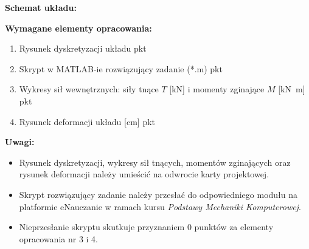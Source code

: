 \documentclass[a4paper,10pt]{article}
\begin{document}
    \vspace{5mm}

    \noindent\textbf{Schemat układu:}

    \vspace{5mm}

    \noindent\textbf{Wymagane elementy opracowania:}

    \begin{enumerate}
    \item Rysunek dyskretyzacji układu  pkt
    \item Skrypt w MATLAB-ie rozwiązujący zadanie (*.m)  pkt
    \item Wykresy sił wewnętrznych: siły tnące \(T\) [\si{\kilo\newton}] i momenty zginające \(M\) [\si{\kilo\newton m}]  pkt
    \item Rysunek deformacji układu [\si{\centi\meter}]  pkt
    \end{enumerate}

    \vspace{5mm}

    \noindent\textbf{Uwagi:}
    \begin{itemize}
    \item Rysunek dyskretyzacji, wykresy sił tnących, momentów zginających oraz rysunek deformacji należy umieścić na odwrocie karty projektowej.
    \item Skrypt rozwiązujący zadanie należy przesłać do odpowiedniego modułu na platformie eNauczanie w ramach kursu \textit{Podstawy Mechaniki Komputerowej}.
    \item Nieprzesłanie skryptu skutkuje przyznaniem 0 punktów za elementy opracowania nr 3 i 4.
    \end{itemize}
\end{document}
